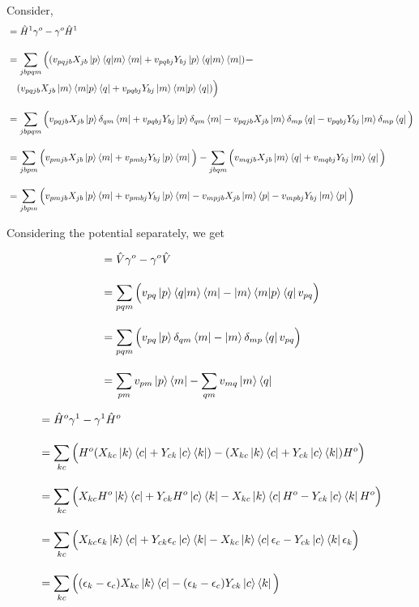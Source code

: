 \documentclass[12pt]{article}
\begin{document}
Consider, 
\begin{align*}
    [\hat{H}^1 , \gamma^o] &= \hat{H}^1 \gamma^o - \gamma^o \hat{H}^1 \\[10pt]
    &= \sum_{jbpqm} \Big( (v_{pqjb} X_{jb} \ket{p}\braket{q|m}\bra{m} + v_{pqbj} Y_{bj} \ket{p}\braket{q|m}\bra{m}) \boldsymbol{-} \\
    &\quad (v_{pqjb} X_{jb} \ket{m}\braket{m|p}\bra{q} + v_{pqbj} Y_{bj} \ket{m}\braket{m|p}\bra{q}) \Big) \\[10pt]
    &= \sum_{jbpqm} \Big( v_{pqjb} X_{jb} \ket{p}\delta_{qm}\bra{m} + v_{pqbj} Y_{bj} \ket{p}\delta_{qm}\bra{m} 
     - v_{pqjb} X_{jb} \ket{m}\delta_{mp}\bra{q} - v_{pqbj} Y_{bj} \ket{m}\delta_{mp}\bra{q} \Big) \\[10pt]
    &= \sum_{jbpm} \Big( v_{pmjb} X_{jb} \ket{p} \bra{m} + v_{pmbj} Y_{bj} \ket{p}\bra{m} \Big) 
     - \sum_{jbqm} \Big( v_{mqjb} X_{jb} \ket{m}\bra{q} + v_{mqbj} Y_{bj} \ket{m}\bra{q} \Big) \\[10pt]
    &= \sum_{jbpm} \Big( v_{pmjb} X_{jb} \ket{p} \bra{m} + v_{pmbj} Y_{bj} \ket{p}\bra{m} 
     - v_{mpjb} X_{jb} \ket{m}\bra{p} - v_{mpbj} Y_{bj} \ket{m}\bra{p} \Big)
\end{align*}

Considering the potential separately, we get 

\begin{align*}
    [\hat{V},\gamma^o] &= \hat{V} \gamma^o - \gamma^o \hat{V} \\[10pt]
    &= \sum_{pqm} \Big( v_{pq }\ket{p}\braket{q|m}\bra{m} - \ket{m}\braket{m|p}\bra{q} v_{pq} \Big)\\[10pt]
    &= \sum_{pqm} \Big( v_{pq }\ket{p}\delta_{qm}\bra{m} - \ket{m}\delta_{mp}\bra{q} v_{pq} \Big) \\[10pt]
    &= \sum_{pm} v_{pm} \ket{p}\bra{m} - \sum_{qm} v_{mq} \ket{m}\bra{q}
\end{align*}

\begin{align*}
    [\hat{H}^o , \gamma^1] &= \hat{H}^o \gamma^1 - \gamma^1 \hat{H}^o \\[10pt]
    &= \sum_{kc} \Big( H^o ( X_{kc} \ket{k}\bra{c} + Y_{ck} \ket{c}\bra{k}) - (X_{kc} \ket{k}\bra{c} + 
    Y_{ck} \ket{c}\bra{k})H^o \Big) \\[10pt]
    &=  \sum_{kc} \Big(  X_{kc} H^o\ket{k}\bra{c} + Y_{ck} H^o\ket{c}\bra{k} - X_{kc} \ket{k}\bra{c}H^o - Y_{ck} 
    \ket{c}\bra{k}H^o \Big)\\[10pt]
    &=  \sum_{kc} \Big(  X_{kc} \epsilon_k \ket{k}\bra{c} + Y_{ck} \epsilon_c \ket{c}\bra{k} - X_{kc} \ket{k}\bra{c} 
    \epsilon_c - Y_{ck} \ket{c}\bra{k} \epsilon_k \Big)\\[10pt]
    &= \sum_{kc} \Big( (\epsilon_k - \epsilon_c) X_{kc} \ket{k} \bra{c} - (\epsilon_k - \epsilon_c) Y_{ck} \ket{c}\bra{k} \Big)
\end{align*}
\end{document}

